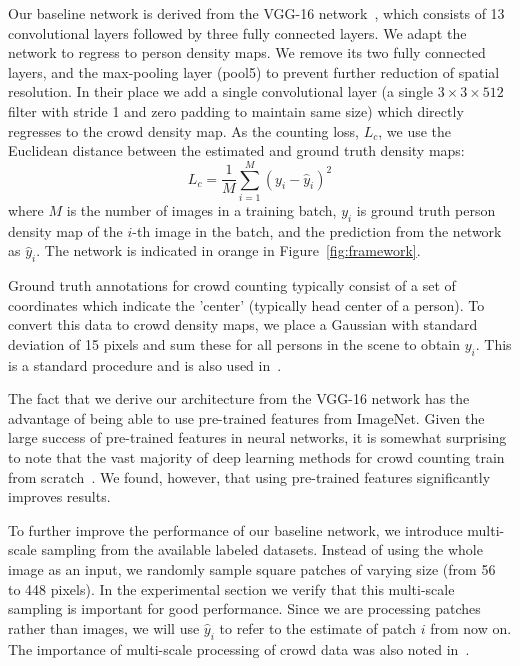 \documentclass[10pt,twocolumn,letterpaper]{article}
\begin{document}
Our baseline network is derived from the VGG-16 network~\cite{simonyan2014very}, which consists of 13 convolutional layers followed by three fully connected layers. We adapt the network to regress to person density maps. We remove its two fully connected layers, and the max-pooling layer (pool5) to prevent further reduction of spatial resolution. In their place we add a single convolutional layer (a single $3 \times 3 \times 512$ filter with stride 1 and zero padding to maintain same size) which directly regresses to the crowd density map. As the counting loss, $L_c$, we use the Euclidean distance between the estimated and ground truth density maps:
\begin{equation}
\label{eul}
L_c = \frac { 1 }{ M } \sum _{ i=1 }^{ M } (y_{i}-\hat{y}_{i})^2
\end{equation}
where $M$ is the number of images in a training batch, $y_i$ is ground truth person density map of the $i$-th image in the batch, and the prediction from the network as $\hat{y}_i$. The network is indicated in orange in Figure~\ref{fig:framework}. 

Ground truth annotations for crowd counting typically consist of a set of coordinates which indicate the 'center' (typically head center of a person). To convert this data to crowd density maps, we place a Gaussian with standard deviation of 15 pixels and sum these for all persons in the scene to obtain $y_i$. This is a standard procedure and is also used in~\cite{onoro2016towards,zhang2016single}.

The fact that we derive our architecture from the VGG-16 network has the advantage of being able to use pre-trained features from ImageNet. Given the large success of pre-trained features in neural networks, it is somewhat surprising to note that the vast majority of deep learning methods for crowd counting train from scratch~\cite{zhang2016single,Sam_2017_CVPR,sindagi2017generating}. We found, however, that using pre-trained features significantly improves results. 

To further improve the performance of our baseline network, we
introduce multi-scale sampling from the available labeled datasets. Instead of using the whole image as an input,
we randomly sample square patches of varying size (from 56 to 448
pixels). In the experimental section we verify that this multi-scale
sampling is important for good performance. Since we are processing
patches rather than images, we will use $\hat{y}_{i}$ to refer to the estimate of patch $i$ from now on. The importance of multi-scale processing of crowd data was also noted in~\cite{boominathan2016crowdnet}.
\end{document}
